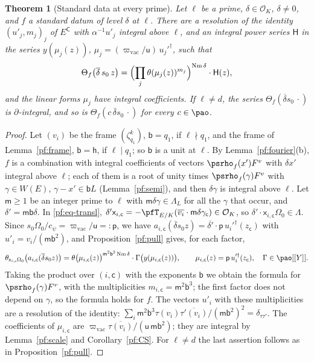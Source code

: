 \documentclass[10pt]{amsart}
\newtheorem{theorem}{Theorem}[section]
\theoremstyle{definition}
\theoremstyle{remark}
\providecommand{\auNm}{\operatorname{Nm}}
\providecommand{\auO}{\mathcal O}
\providecommand{\aubar}[1]{\overline{#1}}
\begin{document}
\begin{theorem}[Standard data at every prime]\label{pf:std}
Let $\ell$ be a prime, $\delta\in\auO_K$, $\delta\ne0$, and $f$ a standard datum of level $\delta$
at $\ell$. There are a resolution of the identity $(u'_j,m_j)_j$ of $E^{\mathsf C}$ with
$\alpha^{-1}u'_j$ integral above $\ell$, and an integral power series $\mathsf H$ in the series
$y(\mu_j(z))$, $\mu_j=(\varpi_{\mathrm{vac}}/\mathsf u)\,u_j'^{\dagger}$, such that
\[
\Theta_f\bigl(\aubar\delta\,s_0\,z\bigr)=\Bigl(\prod_j\theta(\mu_j(z))^{m_j}\Bigr)^{\auNm\delta}
\cdot\mathsf H(z),
\]
and the linear forms $\mu_j$ have integral coefficients. If $\ell\ne d$, the series
$\Theta_f(\aubar\delta s_0\,\cdot)$ is $\partial$-integral, and so is $\Theta_f(c\,\aubar\delta s_0
\,\cdot)$ for every $c\in\pao$.
\end{theorem}
\begin{proof}
Let $(v_i)$ be the frame $(\zeta_{q_1}^k)$, $\mathsf b=q_1$, if $\ell\nmid q_1$, and the frame of
Lemma~\ref{pf:frame}, $\mathsf b=\mathsf h$, if $\ell\mid q_1$; so $\mathsf b$ is a unit at
$\ell$. By Lemma~\ref{pf:fourier}(b), $f$ is a combination with integral coefficients of vectors
$\psrho_f(x')F^v$ with $\delta x'$ integral above $\ell$; each of them is a root of unity times
$\psrho_f(\gamma)F^v$ with $\gamma\in W(E)$, $\gamma-x'\in\mathsf bL$ (Lemma~\ref{pf:semi}), and
then $\delta\gamma$ is integral above $\ell$. Let $\mathsf m\ge1$ be an integer prime to $\ell$
with $\mathsf m\delta\gamma\in\Lambda_L$ for all the $\gamma$ that occur, and $\delta'=\mathsf m
\mathsf b\delta$. In \eqref{pf:eq-transl}, $\delta'\mathsf x_{i,\mathsf c}=-\pfT_{E/K}(\aubar{v_i}
\cdot\mathsf m\delta\gamma_{\mathsf c})\in\auO_K$, so $\delta'\cdot\mathsf x_{i,\mathsf c}\Omega_0
\in\Lambda$. Since $s_0\Omega_0/c_\psi=\varpi_{\mathrm{vac}}/\mathsf u=:\mathsf p$, we have
$a_{i,\mathsf c}(\aubar\delta s_0z)=\aubar{\delta'}\cdot\mathsf p\,u_i'^{\dagger}(z_{\mathsf c})$
with $u'_i=v_i/(\mathsf m\mathsf b^2)$, and Proposition~\ref{pf:pull} gives, for each factor,
\[
\theta_{\mathsf x_{i,\mathsf c}\Omega_0}\bigl(a_{i,\mathsf c}(\aubar\delta s_0z)\bigr)=\theta
\bigl(\mu_{i,\mathsf c}(z)\bigr)^{\mathsf m^2\mathsf b^2\auNm\delta}\cdot\Gamma\bigl(y(\mu_{i,
\mathsf c}(z))\bigr),\qquad\mu_{i,\mathsf c}(z)=\mathsf p\,u_i'^{\dagger}(z_{\mathsf c}),\quad
\Gamma\in\pao[[Y]].
\]
Taking the product over $(i,\mathsf c)$ with the exponents $\mathsf b$ we obtain the formula for
$\psrho_f(\gamma)F^v$, with the multiplicities $m_{i,\mathsf c}=\mathsf m^2\mathsf b^3$; the first
factor does not depend on $\gamma$, so the formula holds for $f$. The vectors $u'_i$ with these
multiplicities are a resolution of the identity: $\sum_i\mathsf m^2\mathsf b^3\tau(v_i)\aubar{\tau'
(v_i)}/(\mathsf m\mathsf b^2)^2=\delta_{\tau\tau'}$. The coefficients of $\mu_{i,\mathsf c}$ are
$\varpi_{\mathrm{vac}}\aubar{\tau(v_i)}/(\mathsf u\,\mathsf m\mathsf b^2)$; they are integral by
Lemma~\ref{pf:scale} and Corollary~\ref{pf:CS}. For $\ell\ne d$ the last assertion follows as in
Proposition~\ref{pf:pull}.
\end{proof}
\end{document}
